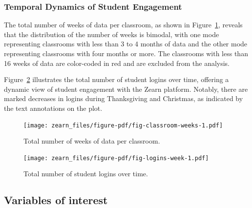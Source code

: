 \documentclass[
  number,
  preprint,
  3p,
  onecolumn]{elsarticle}
\begin{document}
\hypertarget{temporal-dynamics-of-student-engagement}{%
\subsubsection{Temporal Dynamics of Student
Engagement}\label{temporal-dynamics-of-student-engagement}}

The total number of weeks of data per classroom, as shown in
Figure~\ref{fig-classroom-weeks}, reveals that the distribution of the
number of weeks is bimodal, with one mode representing classrooms with
less than 3 to 4 months of data and the other mode representing
classrooms with four months or more. The classrooms with less than 16
weeks of data are color-coded in red and are excluded from the analysis.

Figure~\ref{fig-logins-week} illustrates the total number of student
logins over time, offering a dynamic view of student engagement with the
Zearn platform. Notably, there are marked decreases in logins during
Thanksgiving and Christmas, as indicated by the text annotations on the
plot.

\begin{figure}

{\centering \texttt{[image: zearn\_files/figure-pdf/fig-classroom-weeks-1.pdf]}

}

\caption{\label{fig-classroom-weeks}Total number of weeks of data per
classroom.}

\end{figure}

\begin{figure}

{\centering \texttt{[image: zearn\_files/figure-pdf/fig-logins-week-1.pdf]}

}

\caption{\label{fig-logins-week}Total number of student logins over
time.}

\end{figure}

\hypertarget{variables-of-interest}{%
\subsection{Variables of interest}\label{variables-of-interest}}
\end{document}
